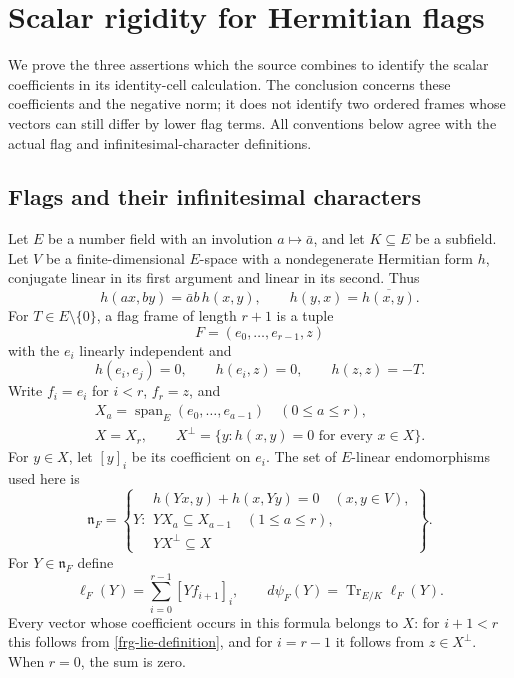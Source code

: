 \section{Scalar rigidity for Hermitian flags}
\label{frg-section}

We prove the three assertions which the source combines to
identify the scalar coefficients in its identity-cell calculation.
The conclusion concerns these coefficients and the negative norm;
it does not identify two ordered frames whose vectors can still
differ by lower flag terms. All conventions below agree with the
actual flag and infinitesimal-character definitions.
\cite{alpo-uniform-source}

\subsection{Flags and their infinitesimal characters}

Let $E$ be a number field with an involution $a\mapsto\bar a$,
and let $K\subseteq E$ be a subfield. Let $V$ be a
finite-dimensional $E$-space with a nondegenerate Hermitian form
$h$, conjugate linear in its first argument and linear in its
second. Thus
\[
 h(ax,by)=\bar a b\,h(x,y),\qquad
 h(y,x)=\overline{h(x,y)}.
\]
For $T\in E\setminus\{0\}$, a flag frame of length $r+1$
is a tuple
\[
 F=(e_0,\ldots,e_{r-1},z)
\]
with the $e_i$ linearly independent and
\[
 h(e_i,e_j)=0,\qquad h(e_i,z)=0,\qquad h(z,z)=-T.
\]
Write $f_i=e_i$ for $i<r$, $f_r=z$, and
\begin{gather*}
 X_a=\operatorname{span}_E(e_0,\ldots,e_{a-1})\quad(0\le a\le r),
 \\
 X=X_r,\qquad
 X^\perp=\{y:h(x,y)=0\text{ for every }x\in X\}.
\end{gather*}
For $y\in X$, let $[y]_i$ be its coefficient on $e_i$.
The set of $E$-linear endomorphisms used here is
\begin{equation}\label{frg-lie-definition}
 \mathfrak n_F=\left\{Y:
 \begin{array}{l}
 h(Yx,y)+h(x,Yy)=0\quad(x,y\in V),\\
 YX_a\subseteq X_{a-1}\quad(1\le a\le r),\\
 YX^\perp\subseteq X
 \end{array}\right\}.
\end{equation}
For $Y\in\mathfrak n_F$ define
\begin{equation}\label{frg-character}
 \ell_F(Y)=\sum_{i=0}^{r-1}[Yf_{i+1}]_i,
 \qquad d\psi_F(Y)=\operatorname{Tr}_{E/K}\ell_F(Y).
\end{equation}
Every vector whose coefficient occurs in this formula belongs
to $X$: for $i+1<r$ this follows from
\eqref{frg-lie-definition}, and for $i=r-1$ it follows from
$z\in X^\perp$. When $r=0$, the sum is zero.

